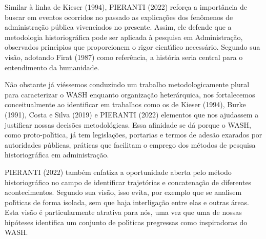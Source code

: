 \documentclass[
12pt,		%
openright,	%
twoside,  %
a4paper,			%
chapter=TITLE,		%
english,			%
french,				%
spanish,			%
brazil				%
]{USPSC-classe/USPSC}
\begin{document}
Similar \`a linha de  Kieser (1994),  PIERANTI (2022) refor\c{c}a a import\^ancia de buscar em eventos ocorridos no passado as explica\c{c}\~oes dos fen\^omenos de administra\c{c}\~ao p\'ublica vivenciados no presente. Assim, ele defende que \textquotedbl a metodologia historiogr\'afica pode ser aplicada \`a pesquisa em Administra\c{c}\~ao\textquotedbl , observados princ\'{\i}pios que proporcionem o rigor cient\'{\i}fico necess\'ario. Segundo sua vis\~ao, adotando  Firat (1987) como refer\^encia, a hist\'oria seria \textquotedbl central para o entendimento da humanidade\textquotedbl .

















N\~ao obstante j\'a vi\'essemos conduzindo um trabalho metodologicamente plural para caracterizar o WASH enquanto organiza\c{c}\~ao heter\'arquica, nos fortalecemos conceitualmente ao identificar em trabalhos como os de  Kieser (1994),  Burke (1991), Costa e Silva (2019) e PIERANTI (2022) elementos que nos ajudassem a justificar nossas decis\~oes metodol\'ogicas. Essa afinidade se d\'a porque o WASH, como proto-pol\'{\i}tica, j\'a tem legisla\c{c}\~oes, portarias e termos de ades\~ao exarados por autoridades p\'ublicas, pr\'aticas que facilitam o emprego dos m\'etodos de pesquisa historiogr\'afica em administra\c{c}\~ao.

















 PIERANTI (2022) tamb\'em enfatiza a oportunidade aberta pelo m\'etodo historiogr\'afico  no campo de identificar trajet\'orias e concatena\c{c}\~ao de diferentes acontecimentos. Segundo sua vis\~ao, \textquotedbl isso evita, por exemplo que se analisem pol\'{\i}ticas de forma isolada, sem que haja interliga\c{c}\~ao entre elas e outras \'areas\textquotedbl . Esta vis\~ao \'e particularmente atrativa para n\'os, uma vez que uma de nossas hip\'oteses identifica um conjunto de pol\'{\i}ticas pregressas como inspiradoras do WASH.
\end{document}
